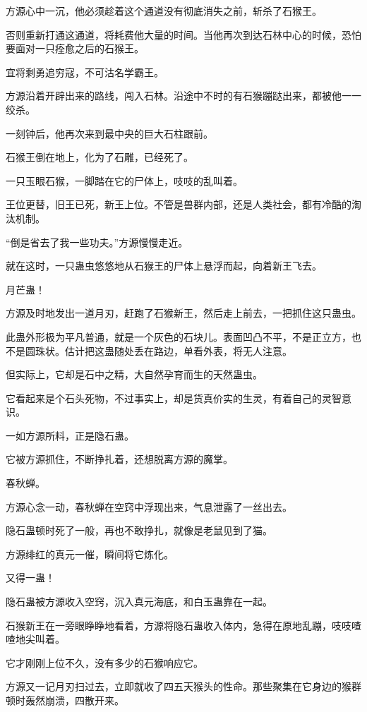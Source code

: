 \begin{this_body}
方源心中一沉，他必须趁着这个通道没有彻底消失之前，斩杀了石猴王。

否则重新打通这通道，将耗费他大量的时间。当他再次到达石林中心的时候，恐怕要面对一只痊愈之后的石猴王。

宜将剩勇追穷寇，不可沽名学霸王。

方源沿着开辟出来的路线，闯入石林。沿途中不时的有石猴蹦跶出来，都被他一一绞杀。

一刻钟后，他再次来到最中央的巨大石柱跟前。

石猴王倒在地上，化为了石雕，已经死了。

一只玉眼石猴，一脚踏在它的尸体上，吱吱的乱叫着。

王位更替，旧王已死，新王上位。不管是兽群内部，还是人类社会，都有冷酷的淘汰机制。

“倒是省去了我一些功夫。”方源慢慢走近。

就在这时，一只蛊虫悠悠地从石猴王的尸体上悬浮而起，向着新王飞去。

月芒蛊！

方源及时地发出一道月刃，赶跑了石猴新王，然后走上前去，一把抓住这只蛊虫。

此蛊外形极为平凡普通，就是一个灰色的石块儿。表面凹凸不平，不是正立方，也不是圆珠状。估计把这蛊随处丢在路边，单看外表，将无人注意。

但实际上，它却是石中之精，大自然孕育而生的天然蛊虫。

它看起来是个石头死物，不过事实上，却是货真价实的生灵，有着自己的灵智意识。

一如方源所料，正是隐石蛊。

它被方源抓住，不断挣扎着，还想脱离方源的魔掌。

春秋蝉。

方源心念一动，春秋蝉在空窍中浮现出来，气息泄露了一丝出去。

隐石蛊顿时死了一般，再也不敢挣扎，就像是老鼠见到了猫。

方源绯红的真元一催，瞬间将它炼化。

又得一蛊！

隐石蛊被方源收入空窍，沉入真元海底，和白玉蛊靠在一起。

石猴新王在一旁眼睁睁地看着，方源将隐石蛊收入体内，急得在原地乱蹦，吱吱喳喳地尖叫着。

它才刚刚上位不久，没有多少的石猴响应它。

方源又一记月刃扫过去，立即就收了四五天猴头的性命。那些聚集在它身边的猴群顿时轰然崩溃，四散开来。


\end{this_body}
